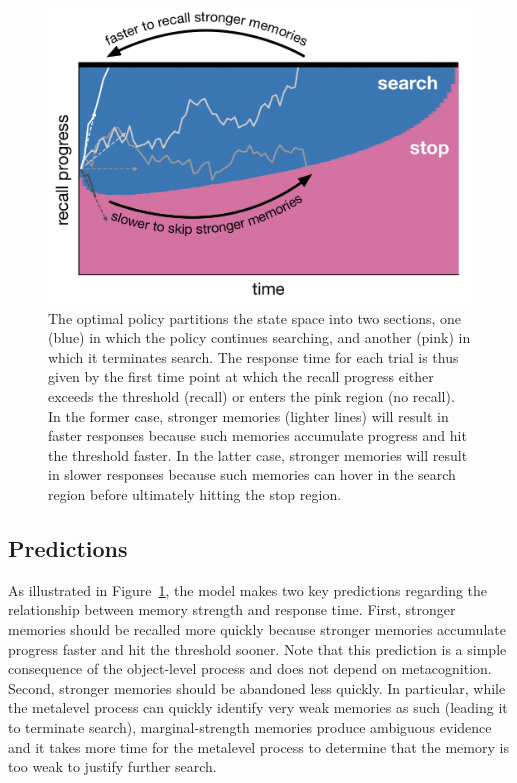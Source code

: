 \begin{figure}[ht]
  \centering
  \includegraphics[scale=0.45]{figs/memory/exp1_predictions.pdf}
  \caption{
    The optimal policy partitions the state space into two sections, one (blue) in which the policy continues searching, and another (pink) in which it terminates search. The response time for each trial is thus given by the first time point at which the recall progress either exceeds the threshold (recall) or enters the pink region (no recall). In the former case, stronger memories (lighter lines) will result in faster responses because such memories accumulate progress and hit the threshold faster. In the latter case, stronger memories will result in slower responses because such memories can hover in the search region before ultimately hitting the stop region.
  }
  \label{fig:exp1_predictions}
\end{figure}

\subsection{Predictions}

As illustrated in Figure~\ref{fig:exp1_predictions}, the model makes two key predictions regarding the relationship between memory strength and response time. First, stronger memories should be recalled more quickly because stronger memories accumulate progress faster and hit the threshold sooner. Note that this prediction is a simple consequence of the object-level process and does not depend on metacognition. Second, stronger memories should be abandoned less quickly. In particular, while the metalevel process can quickly identify very weak memories as such (leading it to terminate search), marginal-strength memories produce ambiguous evidence and it takes more time for the metalevel process to determine that the memory is too weak to justify further search.

